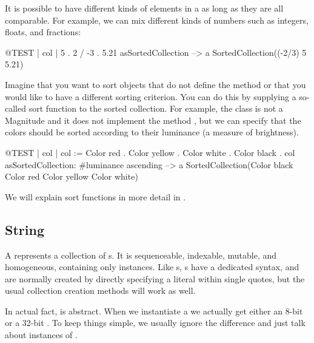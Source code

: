 \documentclass[a4paper,10pt,twoside]{book}
\begin{document}
It is possible to have different kinds of elements in a  as long as they are all comparable.
For example, we can mix different kinds of numbers such as integers, floats, and fractions:
\begin{code}{@TEST | col |}
{5 . 2 / -3 . 5.21} asSortedCollection --> a SortedCollection((-2/3) 5 5.21)
\end{code}

Imagine that you want to sort objects that do not define the method \ct{<=} or that you would like to have a different sorting criterion.
You can do this by supplying a so-called sort function to the sorted collection.
For example, the class  is not a Magnitude and it does not implement the method \ct{<=}, but we can specify that the colors should be sorted according to their luminance (a measure of brightness).

\begin{code}{@TEST | col |}
col := { Color red . Color yellow . Color white . Color black }.
col asSortedCollection: #luminance ascending --> a SortedCollection(Color black Color red Color yellow Color white)
\end{code}

We will explain sort functions in more detail in .

\subsection{String}
A \st {} represents a collection of s.
It is sequenceable, indexable, mutable, and homogeneous, containing only  instances.
Like s, s have a dedicated syntax, and are normally created by directly specifying a  literal within single quotes, but the usual collection creation methods will work as well.


In actual fact,  is abstract.
When we instantiate a  we actually get either an 8-bit  or a 32-bit .
To keep things simple, we usually ignore the difference and just talk about instances of .
\end{document}
